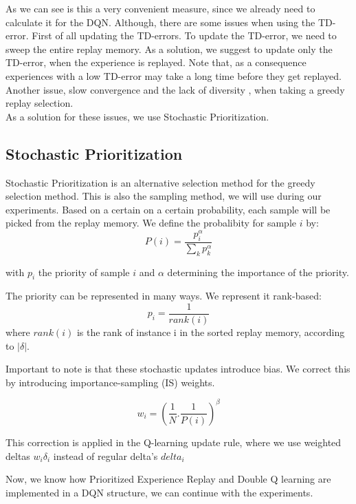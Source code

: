 \documentclass{sig-alternate}
\begin{document}
As we can see is this a very convenient measure, since we already need to calculate it for the DQN. Although, there are some issues when using the TD-error. First of all updating the TD-errors. To update the TD-error, we need to sweep the entire replay memory. As a solution, we suggest to update only the TD-error, when the experience is replayed. Note that, as a consequence experiences with a low TD-error may take a long time before they get replayed. Another issue, slow convergence and the lack of diversity , when taking a greedy replay selection.\\
As a solution for these issues, we use Stochastic Prioritization. 
\subsection{Stochastic Prioritization}

Stochastic Prioritization is an alternative selection method for the greedy selection method. This is also the sampling method, we will use during our experiments. Based on a certain on a certain probability, each sample will be picked from the replay memory. We define the probalibity for sample $i$ by:
\begin{equation}
P(i)=\frac{p_{i}^\alpha}{\sum_{k}{p_{k}^\alpha}}
\end{equation} 

with $p_i$ the priority of sample $i$ and $\alpha$ determining the importance of the priority.

The priority can be represented in many ways. We represent it rank-based:
\begin{equation}
p_i=\frac{1}{rank(i)} 
\end{equation}
where $rank(i)$ is the rank of instance i in the sorted replay memory, according to $|\delta|$.

Important to note is that these stochastic updates introduce bias. We correct this by introducing importance-sampling (IS) weights. \cite{schaul2015prioritized}

\begin{equation}
w_i=(\frac{1}{N}. \frac{1}{P(i)})^\beta 
\end{equation}

This correction is applied in the Q-learning update rule, where we use weighted deltas $w_i\delta_{i}$ instead of regular delta's $delta_i$

Now, we know how Prioritized Experience Replay and Double Q learning are implemented in a DQN structure, we can continue with the experiments.
\end{document}
